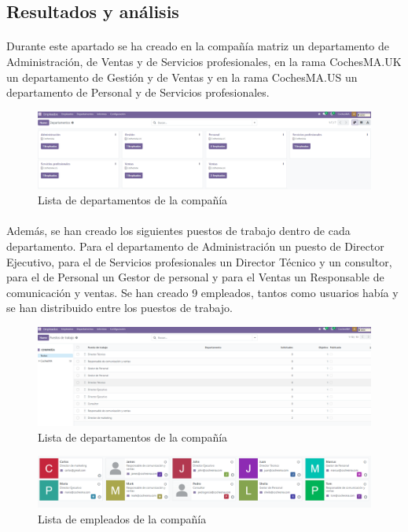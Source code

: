 \subsection{Resultados y análisis}
\paragraph{}
Durante este apartado se ha creado en la compañía matriz un departamento de Administración, de Ventas y de Servicios profesionales, en la rama CochesMA.UK un departamento de Gestión y de Ventas y en la rama CochesMA.US un departamento de Personal y de Servicios profesionales. 
\begin{figure}[h]
    \centering
    \includegraphics[width=1\linewidth]{fotosGestPers/departamentos.png}
    \caption{Lista de departamentos de la compañía}
    \label{fig:enter-label}
\end{figure}
\paragraph{}
Además, se han creado los siguientes puestos de trabajo dentro de cada departamento. Para el departamento de Administración un puesto de Director Ejecutivo, para el de Servicios profesionales un Director Técnico y un consultor, para el de Personal un Gestor de personal y para el Ventas un Responsable de comunicación y ventas. Se han creado 9 empleados, tantos como usuarios había y se han distribuido entre los puestos de trabajo. 
\begin{figure}[h]
    \centering
    \includegraphics[width=1\linewidth]{fotosGestPers/puestos.png}
    \caption{Lista de departamentos de la compañía}
    \label{fig:enter-label}
\end{figure}
\begin{figure}[h]
    \centering
    \includegraphics[width=1\linewidth]{fotosGestPers/empleados.png}
    \caption{Lista de empleados de la compañía}
    \label{fig:enter-label}
\end{figure}
